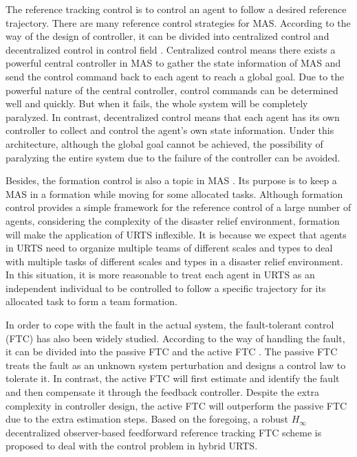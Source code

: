 \documentclass[journal,12pt,onecolumn,draftclsnofoot,]{IEEEtran}
\begin{document}
The reference tracking control is to control an agent to follow a desired reference trajectory. There are many reference control strategies for MAS. According to the way of the design of controller, it can be divided into centralized control and decentralized control in control field \cite{8931370}. Centralized control means there exists a powerful central controller in MAS to gather the state information of MAS and send the control command back to each agent to reach a global goal. Due to the powerful nature of the central controller, control commands can be determined well and quickly. But when it fails, the whole system will be completely paralyzed. In contrast, decentralized control means that each agent has its own controller to collect and control the agent's own state information. Under this architecture, although the global goal cannot be achieved, the possibility of paralyzing the entire system due to the failure of the controller can be avoided.

Besides, the formation control is also a topic in MAS \cite{wang2022consensus}. Its purpose is to keep a MAS in a formation while moving for some allocated tasks. Although formation control provides a simple framework for the reference control of a large number of agents, considering the complexity of the disaster relief environment, formation will make the application of URTS inflexible. It is because we expect that agents in URTS need to organize multiple teams of different scales and types to deal with multiple tasks of different scales and types in a disaster relief environment. In this situation, it is more reasonable to treat each agent in URTS as an independent individual to be controlled to follow a specific trajectory for its allocated task to form a team formation.

In order to cope with the fault in the actual system, the fault-tolerant control (FTC) has also been widely studied. According to the way of handling the fault, it can be divided into the passive FTC and the active FTC \cite{6669235}. The passive FTC treats the fault as an unknown system perturbation and designs a control law to tolerate it. In contrast, the active FTC will first estimate and identify the fault and then compensate it through the feedback controller. Despite the extra complexity in controller design, the active FTC will outperform the passive FTC due to the extra estimation steps. Based on the foregoing, a robust $H_\infty$ decentralized observer-based feedforward reference tracking FTC scheme is proposed to deal with the control problem in hybrid URTS.
\end{document}
